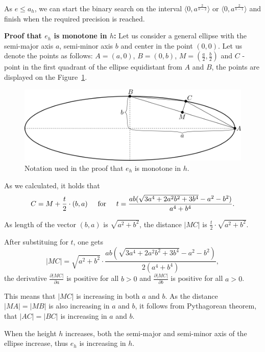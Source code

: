As $e \leq a_h$, we can start the binary search on the interval
$\langle 0, a^\frac{2}{n-2}\rangle$ or $\langle 0, a^\frac{2}{n-1}\rangle$
and finish when the required precision is reached.

\textbf{Proof that $e_h$ is monotone in $h$:} Let us consider a general ellipse
with the semi-major axis $a$, semi-minor axis $b$ and center in the point $(0, 0)$. 
Let us denote the points as follows: $A=(a, 0)$, $B=(0, b)$, $M=(\frac{a}{2}, \frac{b}{2})$ 
and $C$ - point in the first quadrant of the ellipse equidistant from $A$ and $B$, the points
are displayed on the Figure~\ref{img:40}.

\begin{figure}
    \centerline{\includegraphics[scale=0.5]{images/img40}}
    \caption[Notation used in the proof]
    {Notation used in the proof that $e_h$ is monotone in $h$.}
    \label{img:40}
\end{figure}

As we calculated, it holds that
$$C = M + \frac{t}{2} \cdot (b, a) \hspace{5mm} \textrm{for} \hspace{5mm} t=\frac{ab(\sqrt{3a^4+2a^2b^2+3b^4}-a^2-b^2)}{a^4+b^4}.$$

As length of the vector $(b,a)$ is $\sqrt{a^2+b^2}$, the distance 
$|MC|$ is $\frac{t}{2} \cdot \sqrt{a^2+b^2}$.

After substituing for $t$, one gets 
$$|MC|=\sqrt{a^2+b^2}\cdot\frac{ab(\sqrt{3a^4+2a^2b^2+3b^4}-a^2-b^2)}{2(a^4+b^4)},$$
the derivative $\frac{\partial|MC|}{\partial a}$ is positive for all $b>0$ and
$\frac{\partial|MC|}{\partial b}$ is positive for all $a>0$.

This means that $|MC|$ is increasing in both $a$ and $b$. As the distance $|MA|=|MB|$ is 
also increasing in $a$ and $b$, it follows from Pythagorean theorem, that $|AC|=|BC|$
is increasing in $a$ and $b$.

When the height $h$ increases, both the semi-major and semi-minor axis of the ellipse increase,
thus $e_h$ is increasing in $h$.

